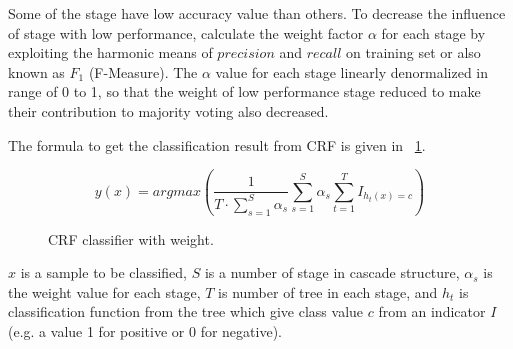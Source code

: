 Some of the stage have low accuracy value than others.
To decrease the influence of stage with low performance, calculate the weight
factor $\alpha$ for each stage by exploiting the harmonic means of $precision$
and $recall$ on training set or also known as $F_1$ (F-Measure).
The $\alpha$ value for each stage linearly denormalized in range of 0 to 1, so
that the weight of low performance stage reduced to make their contribution to
majority voting also decreased.

The formula to get the classification result from CRF is given in
\figurename\ \ref{form:crf}.

\begin{figure}[h]
\[
	y(x) = argmax \left(
			\frac{1}{T \cdot \sum^{S}_{s=1} \alpha_{s} }
			\sum\limits_{s=1}^{S} \alpha_{s}
			\sum\limits^{T}_{t=1} I_{h_{t} (x) = c}
		\right)
\]
\caption{CRF classifier with weight.}
\label{form:crf}
\end{figure}

$x$ is a sample to be classified,
$S$ is a number of stage in cascade structure,
$\alpha_{s}$ is the weight value for each stage,
$T$ is number of tree in each stage, and
$h_{t}$ is classification function from the tree which give class value $c$
from an indicator $I$ (e.g. a value 1 for positive or 0 for negative).
